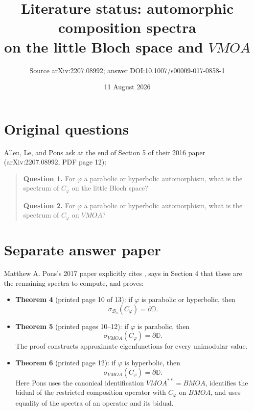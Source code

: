 \documentclass[11pt]{article}
\title{Literature status: automorphic composition spectra\\
on the little Bloch space and $VMOA$}
\author{Source arXiv:2207.08992; answer DOI:10.1007/s00009-017-0858-1}
\date{11 August 2026}
\newcommand{\D}{\mathbb D}
\begin{document}
\maketitle

\begin{center}
\end{center}

\section*{Original questions}

Allen, Le, and Pons ask at the end of Section 5 of their 2016 paper
\cite{ALP} (arXiv:2207.08992, PDF page 12):
\begin{quote}
\textbf{Question 1.} For $\varphi$ a parabolic or hyperbolic automorphism,
what is the spectrum of $C_\varphi$ on the little Bloch space?

\textbf{Question 2.} For $\varphi$ a parabolic or hyperbolic automorphism,
what is the spectrum of $C_\varphi$ on $VMOA$?
\end{quote}

\section*{Separate answer paper}

Matthew A. Pons's 2017 paper \cite{Pons} explicitly cites \cite{ALP}, says in
Section 4 that these are the remaining spectra to compute, and proves:
\begin{itemize}
\item \textbf{Theorem 4} (printed page 10 of 13): if $\varphi$ is parabolic or
hyperbolic, then
\[
  \sigma_{\mathcal B_0}(C_\varphi)=\partial\D.
\]
\item \textbf{Theorem 5} (printed pages 10--12): if $\varphi$ is parabolic,
then
\[
  \sigma_{VMOA}(C_\varphi)=\partial\D.
\]
The proof constructs approximate eigenfunctions for every unimodular value.
\item \textbf{Theorem 6} (printed page 12): if $\varphi$ is hyperbolic, then
\[
  \sigma_{VMOA}(C_\varphi)=\partial\D.
\]
Here Pons uses the canonical identification $VMOA^{**}=BMOA$, identifies the
bidual of the restricted composition operator with $C_\varphi$ on $BMOA$, and
uses equality of the spectra of an operator and its bidual.
\end{itemize}
\end{document}
